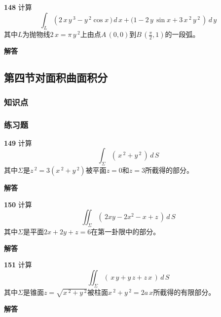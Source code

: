 \documentclass[a4paper,10pt]{article} %
\begin{document}

\textheight


\par\noindent \textbf{148} \quad 计算
$$ \int_L \left(2\,x\,y\,^3-y\,^2\cos x\,)\,d\,x+(1-2\,y\,\sin x+3\,x\,^2\,y\,^2\,\right)\,d\,y$$
其中$L$为抛物线$2\,x=\pi\, y\,^2$上由点$A\,(0,0)$到$\displaystyle B\,\left(\frac{\pi}{2},1\right)$的一段弧。
\par\noindent \textbf{ 解答}




\textheight


\newpage
\subsection{第四节\quad 对面积曲面积分}
\subsubsection{知识点}
\subsubsection{练习题}
\par\noindent \textbf{149} \quad 计算
$$ \int_{\Sigma} \left(\,x\,^2+y\,^2\,\right)\,d\,S$$
其中$\Sigma$是$z\,^2=3\left(x\,^2+y\,^2\right)$被平面$z=0$和$z=3$所截得的部分。
\par\noindent \textbf{ 解答}




\textheight


\par\noindent \textbf{150} \quad 计算
$$ \iint_{\Sigma} \left(\,2xy-2x^2-x+z\,\right)\,d\,S$$
其中$\Sigma$是平面$2x+2y+z=6$在第一卦限中的部分。
\par\noindent \textbf{ 解答}




\textheight


\par\noindent \textbf{151} \quad 计算
$$ \iint_{\Sigma} \left(\,x\,y+y\,z+z\,x\,\right)\,d\,S$$
其中$\Sigma$是锥面$z=\sqrt{x\,^2+y\,^2}$被柱面$x\,^2+y\,^2=2a\,x$所截得的有限部分。
\par\noindent \textbf{ 解答}
\end{document}
